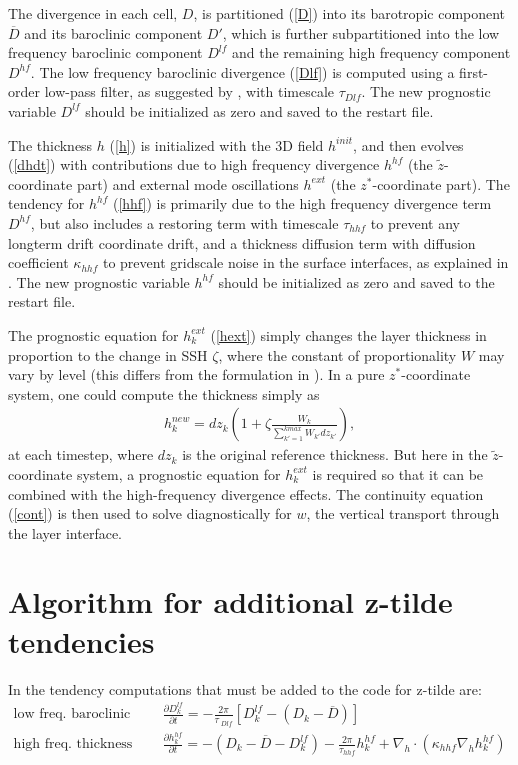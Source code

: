 \documentclass[11pt]{report}
\newcommand{\bea}{\begin{eqnarray}}
\newcommand{\eea}{\end{eqnarray}}
\begin{document}
The divergence in each cell, $D$, is partitioned (\ref{D}) into its barotropic component ${\overline D}$ and its baroclinic component $D'$, which is further subpartitioned into the low frequency baroclinic component $D^{lf}$ and the remaining high frequency component $D^{hf}$.  The low frequency baroclinic divergence (\ref{Dlf}) is computed using a first-order low-pass filter, as suggested by \cite{Leclair:2011ud}, with timescale $\tau_{Dlf}$.  The new prognostic variable $D^{lf}$ should be initialized as zero and saved to the restart file.

The thickness $h$ (\ref{h}) is initialized with the 3D field $h^{init}$, and then evolves (\ref{dhdt}) with contributions due to high frequency divergence $h^{hf}$ (the ${\tilde z}$-coordinate part) and external mode oscillations $h^{ext}$ (the $z^*$-coordinate part).  The tendency for $h^{hf}$ (\ref{hhf}) is primarily due to the high frequency divergence term $D^{hf}$, but also includes a restoring term with timescale $\tau_{hhf}$ to prevent any longterm drift coordinate drift, and a thickness diffusion term with diffusion coefficient $\kappa_{hhf}$ to prevent gridscale noise in the surface interfaces, as explained in \cite{Leclair:2011ud}.  The new prognostic variable $h^{hf}$ should be initialized as zero and saved to the restart file.

The prognostic equation for $h^{ext}_k$ (\ref{hext}) simply changes the layer thickness in proportion to the change in SSH $\zeta$, where the constant of proportionality $W$ may vary by level (this differs from the formulation in \cite{Leclair:2011ud}).  In a pure $z^*$-coordinate system, one could compute the thickness simply as
\bea
   h_k^{new} = dz_k\left( 1+ \zeta \frac{W_k}{\sum_{k'=1}^{kmax}W_{k'}{dz}_{k'}}\right),
\eea
at each timestep, where $dz_k$ is the original reference thickness.  But here in the ${\tilde z}$-coordinate system, a prognostic equation for $h^{ext}_k$ is required so that it can be combined with the high-frequency divergence effects.
The continuity equation (\ref{cont}) is then used to solve diagnostically for $w$, the vertical transport through the layer interface.

\section{Algorithm for additional z-tilde tendencies \label{s tend alg}}

In the tendency computations that must be added to the code for z-tilde are:
\bea 
\mbox{low freq. baroclinic div.} && 
  \frac{\partial D^{lf}_k}{\partial t} 
= - \frac{2\pi}{\tau_{\;Dlf}} \left[ D^{lf}_k - (D_k-{\overline D}) \right] \label{Dlf2}\\
\mbox{high freq. thickness tend.} && 
  \frac{\partial h^{hf}_k}{\partial t} = - (D_k-{\overline D}-D^{lf}_k) - \frac{2\pi}{\tau_{hhf}} h^{hf}_k 
   + \nabla_h\cdot \left( \kappa_{hhf} \nabla_h h^{hf}_k \right)
   \label{hhf2} 
\eea
\end{document}
